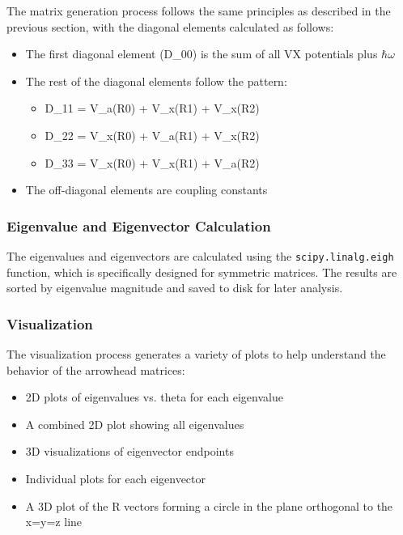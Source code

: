 The matrix generation process follows the same principles as described in the previous section, with the diagonal elements calculated as follows:

\begin{itemize}
    \item The first diagonal element (D\_00) is the sum of all VX potentials plus $\hbar\omega$
    \item The rest of the diagonal elements follow the pattern:
    \begin{itemize}
        \item D\_11 = V\_a(R0) + V\_x(R1) + V\_x(R2)
        \item D\_22 = V\_x(R0) + V\_a(R1) + V\_x(R2)
        \item D\_33 = V\_x(R0) + V\_x(R1) + V\_a(R2)
    \end{itemize}
    \item The off-diagonal elements are coupling constants
\end{itemize}

\subsubsection{Eigenvalue and Eigenvector Calculation}

The eigenvalues and eigenvectors are calculated using the \texttt{scipy.linalg.eigh} function, which is specifically designed for symmetric matrices. The results are sorted by eigenvalue magnitude and saved to disk for later analysis.

\subsubsection{Visualization}

The visualization process generates a variety of plots to help understand the behavior of the arrowhead matrices:

\begin{itemize}
    \item 2D plots of eigenvalues vs. theta for each eigenvalue
    \item A combined 2D plot showing all eigenvalues
    \item 3D visualizations of eigenvector endpoints
    \item Individual plots for each eigenvector
    \item A 3D plot of the R vectors forming a circle in the plane orthogonal to the x=y=z line
\end{itemize}

